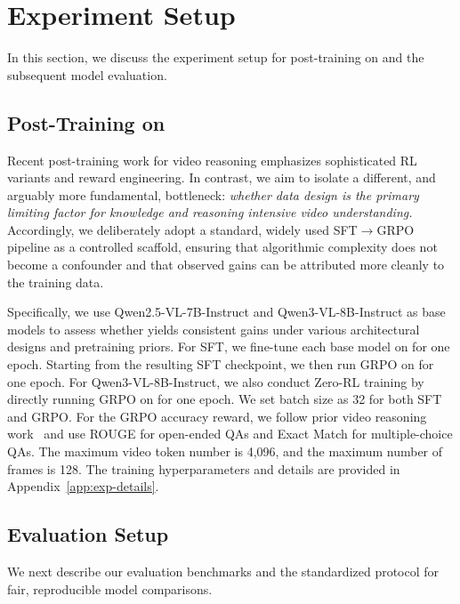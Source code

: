 \section{Experiment Setup}
In this section, we discuss the experiment setup for post-training on \ours and the subsequent model evaluation.



\subsection{Post-Training on \data} 
Recent post-training work for video reasoning emphasizes sophisticated RL variants and reward engineering. In contrast, we aim to isolate a different, and arguably more fundamental, bottleneck: \emph{whether data design is the primary limiting factor for knowledge and reasoning intensive video understanding.} Accordingly, we deliberately adopt a standard, widely used SFT$\rightarrow$GRPO pipeline as a controlled scaffold, ensuring that algorithmic complexity does not become a confounder and that observed gains can be attributed more cleanly to the training data. 

Specifically, we use Qwen2.5-VL-7B-Instruct and Qwen3-VL-8B-Instruct as base models to assess whether \data yields consistent gains under various architectural designs and pretraining priors.
For SFT, we fine-tune each base model on \sftdata for one epoch. Starting from the resulting SFT checkpoint, we then run GRPO on \rldata for one epoch. 
For Qwen3-VL-8B-Instruct, we also conduct Zero-RL training by directly running GRPO on \rldata for one epoch.
We set batch size as 32 for both SFT and GRPO. 
For the GRPO accuracy reward, we follow prior video reasoning work~\cite{videor1, videorft} and use ROUGE for open-ended QAs and Exact Match for multiple-choice QAs.
The maximum video token number is 4,096, and the maximum number of frames is 128. The training hyperparameters and details are provided in Appendix~\ref{app:exp-details}.







\subsection{Evaluation Setup}\label{sec:reproduce-analysis}
We next describe our evaluation benchmarks and the standardized protocol for fair, reproducible model comparisons.

\vspace{-8pt}
